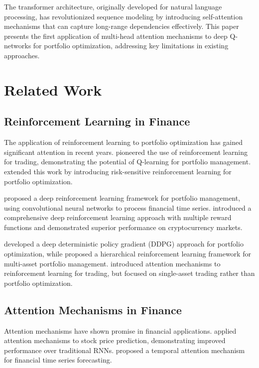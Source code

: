 \documentclass[11pt]{article}
\begin{document}
The transformer architecture, originally developed for natural language processing, has revolutionized sequence modeling by introducing self-attention mechanisms that can capture long-range dependencies effectively. This paper presents the first application of multi-head attention mechanisms to deep Q-networks for portfolio optimization, addressing key limitations in existing approaches.

\section{Related Work}

\subsection{Reinforcement Learning in Finance}

The application of reinforcement learning to portfolio optimization has gained significant attention in recent years. \citet{moody1998performance} pioneered the use of reinforcement learning for trading, demonstrating the potential of Q-learning for portfolio management. \citet{neuneier1998optimal} extended this work by introducing risk-sensitive reinforcement learning for portfolio optimization.

\citet{deng2016deep} proposed a deep reinforcement learning framework for portfolio management, using convolutional neural networks to process financial time series. \citet{jiang2017deep} introduced a comprehensive deep reinforcement learning approach with multiple reward functions and demonstrated superior performance on cryptocurrency markets.

\citet{liu2019deep} developed a deep deterministic policy gradient (DDPG) approach for portfolio optimization, while \citet{chen2019deep} proposed a hierarchical reinforcement learning framework for multi-asset portfolio management. \citet{wang2020deep} introduced attention mechanisms to reinforcement learning for trading, but focused on single-asset trading rather than portfolio optimization.

\subsection{Attention Mechanisms in Finance}

Attention mechanisms have shown promise in financial applications. \citet{li2018attention} applied attention mechanisms to stock price prediction, demonstrating improved performance over traditional RNNs. \citet{chen2019attention} proposed a temporal attention mechanism for financial time series forecasting.
\end{document}
